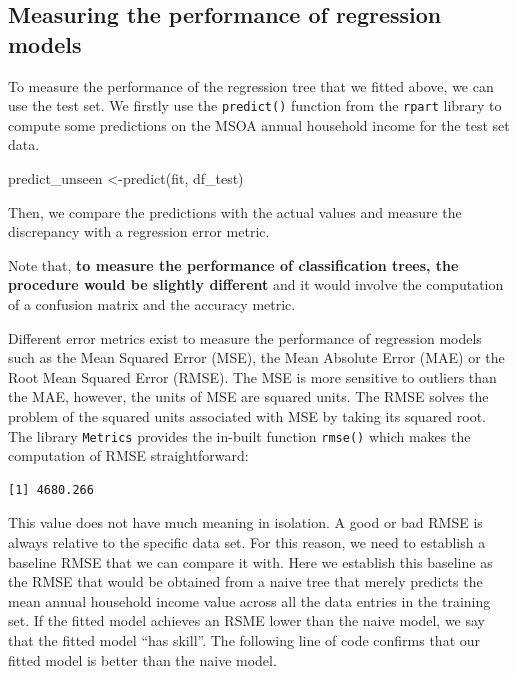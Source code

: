 \documentclass[
  letterpaper,
  DIV=11,
  numbers=noendperiod]{scrreprt}
\newenvironment{Shaded}{\begin{snugshade}}{\end{snugshade}}
\newcommand{\FunctionTok}[1]{\textcolor[rgb]{0.28,0.35,0.67}{#1}}
\newcommand{\NormalTok}[1]{\textcolor[rgb]{0.00,0.23,0.31}{#1}}
\newcommand{\OtherTok}[1]{\textcolor[rgb]{0.00,0.23,0.31}{#1}}
\newcommand{\SpecialCharTok}[1]{\textcolor[rgb]{0.37,0.37,0.37}{#1}}
\begin{document}
\hypertarget{measuring-the-performance-of-regression-models}{%
\subsection{Measuring the performance of regression
models}\label{measuring-the-performance-of-regression-models}}

To measure the performance of the regression tree that we fitted above,
we can use the test set. We firstly use the \texttt{predict()} function
from the \texttt{rpart} library to compute some predictions on the MSOA
annual household income for the test set data.

\begin{Shaded}
\begin{Highlighting}[]
\NormalTok{predict\_unseen }\OtherTok{\textless{}{-}}\FunctionTok{predict}\NormalTok{(fit, df\_test)}
\end{Highlighting}
\end{Shaded}

Then, we compare the predictions with the actual values and measure the
discrepancy with a regression error metric.

Note that, \textbf{to measure the performance of classification trees,
the procedure would be slightly different} and it would involve the
computation of a confusion matrix and the accuracy metric.

Different error metrics exist to measure the performance of regression
models such as the Mean Squared Error (MSE), the Mean Absolute Error
(MAE) or the Root Mean Squared Error (RMSE). The MSE is more sensitive
to outliers than the MAE, however, the units of MSE are squared units.
The RMSE solves the problem of the squared units associated with MSE by
taking its squared root. The library \texttt{Metrics} provides the
in-built function \texttt{rmse()} which makes the computation of RMSE
straightforward:

\begin{Shaded}
\end{Shaded}

\begin{verbatim}
[1] 4680.266
\end{verbatim}

This value does not have much meaning in isolation. A good or bad RMSE
is always relative to the specific data set. For this reason, we need to
establish a baseline RMSE that we can compare it with. Here we establish
this baseline as the RMSE that would be obtained from a naive tree that
merely predicts the mean annual household income value across all the
data entries in the training set. If the fitted model achieves an RSME
lower than the naive model, we say that the fitted model ``has skill''.
The following line of code confirms that our fitted model is better than
the naive model.
\end{document}

